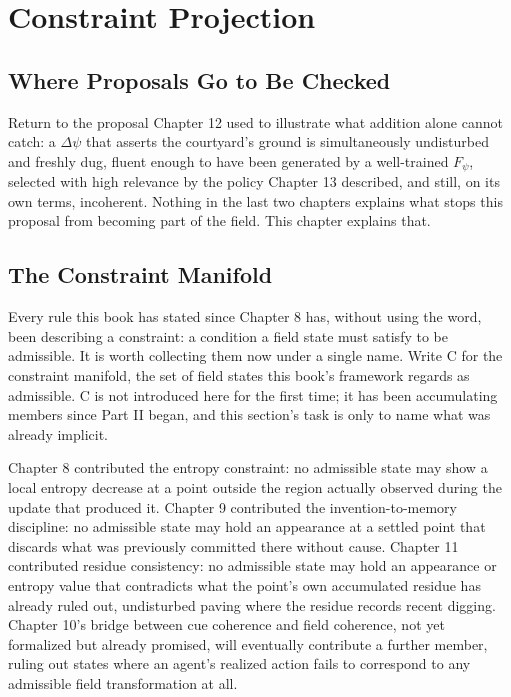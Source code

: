 \chapter{Constraint Projection}

\section{Where Proposals Go to Be Checked}

Return to the proposal Chapter 12 used to illustrate what addition alone cannot catch: a \(\Delta\psi\) that asserts the courtyard's ground is simultaneously undisturbed and freshly dug, fluent enough to have been generated by a well-trained \(F_\psi\), selected with high relevance by the policy Chapter 13 described, and still, on its own terms, incoherent. Nothing in the last two chapters explains what stops this proposal from becoming part of the field. This chapter explains that.

\section{The Constraint Manifold}

Every rule this book has stated since Chapter 8 has, without using the word, been describing a constraint: a condition a field state must satisfy to be admissible. It is worth collecting them now under a single name. Write C for the constraint manifold, the set of field states this book's framework regards as admissible. C is not introduced here for the first time; it has been accumulating members since Part II began, and this section's task is only to name what was already implicit.

Chapter 8 contributed the entropy constraint: no admissible state may show a local entropy decrease at a point outside the region actually observed during the update that produced it. Chapter 9 contributed the invention-to-memory discipline: no admissible state may hold an appearance at a settled point that discards what was previously committed there without cause. Chapter 11 contributed residue consistency: no admissible state may hold an appearance or entropy value that contradicts what the point's own accumulated residue has already ruled out, undisturbed paving where the residue records recent digging. Chapter 10's bridge between cue coherence and field coherence, not yet formalized but already promised, will eventually contribute a further member, ruling out states where an agent's realized action fails to correspond to any admissible field transformation at all.


